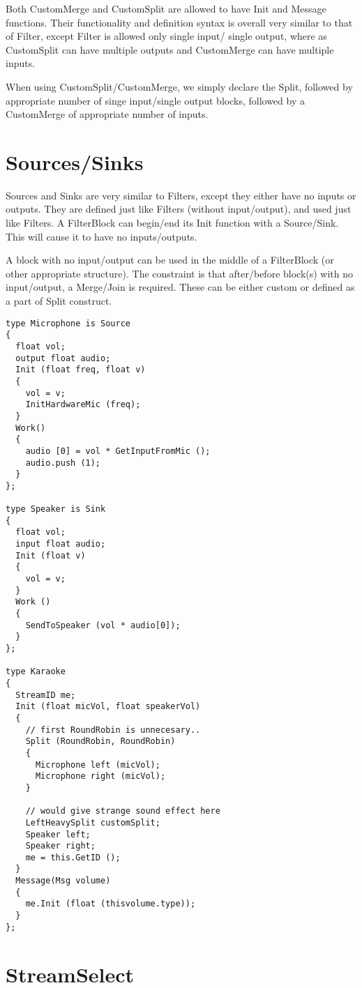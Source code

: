\documentclass[twocolumn, draft]{article}
\begin{document}
Both CustomMerge and CustomSplit are allowed to have Init and Message
functions.  Their functionality and definition syntax is overall very
similar to that of Filter, except Filter is allowed only single input/
single output, where as CustomSplit can have multiple outputs and 
CustomMerge can have multiple inputs.

When using CustomSplit/CustomMerge, we simply declare the Split, followed
by appropriate number of singe input/single output blocks, followed by
a CustomMerge of appropriate number of inputs.

\section{Sources/Sinks}

Sources and Sinks are very similar to Filters, except they either have
no inputs or outputs.  They are defined just like Filters (without
input/output), and used just like Filters.  A FilterBlock can begin/end
its Init function with a Source/Sink.  This will cause it to have
no inputs/outputs.

A block with no input/output can be used in the middle of a FilterBlock (or
other appropriate structure).  The constraint is that after/before block(s) 
with no input/output, a Merge/Join is required.  These can be either
custom or defined as a part of Split construct.

\begin{verbatim}
type Microphone is Source
{
  float vol;
  output float audio;
  Init (float freq, float v)
  {
    vol = v;
    InitHardwareMic (freq);
  }
  Work()
  {
    audio [0] = vol * GetInputFromMic ();
    audio.push (1);
  }
};

type Speaker is Sink
{
  float vol;
  input float audio;
  Init (float v)
  {
    vol = v;
  }
  Work ()
  {
    SendToSpeaker (vol * audio[0]);
  }
};

type Karaoke
{
  StreamID me;
  Init (float micVol, float speakerVol)
  {
    // first RoundRobin is unnecesary..
    Split (RoundRobin, RoundRobin)
    {
      Microphone left (micVol);
      Microphone right (micVol);
    }

    // would give strange sound effect here
    LeftHeavySplit customSplit; 
    Speaker left;
    Speaker right;
    me = this.GetID ();
  }
  Message(Msg volume)
  {
    me.Init (float (thisvolume.type));
  }
};

\end{verbatim}

\section{StreamSelect}
\end{document}

